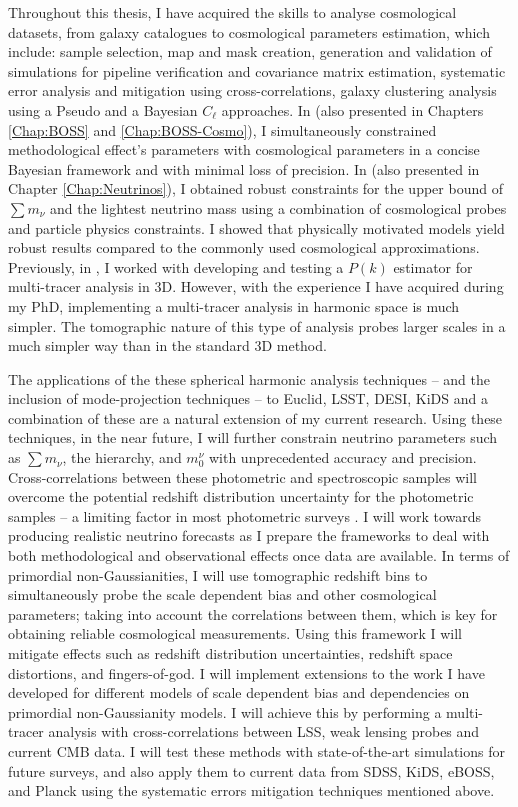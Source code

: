 \qquad Throughout this thesis, I have acquired the skills to analyse cosmological datasets, from galaxy catalogues to cosmological parameters estimation, which include: sample selection, map and mask creation, generation and validation of simulations for pipeline verification and covariance matrix estimation, systematic error analysis and mitigation using cross-correlations, galaxy clustering analysis using a Pseudo and a Bayesian $C_{\ell}$ approaches. In \cite{2018LoureiroBOSS} (also presented in Chapters \ref{Chap:BOSS} and \ref{Chap:BOSS-Cosmo}), I simultaneously constrained methodological effect's parameters with cosmological parameters in a concise Bayesian framework and with minimal loss of precision. In \cite{2018LoureiroNeutrinos} (also presented in Chapter \ref{Chap:Neutrinos}), I obtained robust constraints for the upper bound of $\sum m_{\nu}$ and the lightest neutrino mass using a combination of cosmological probes and particle physics constraints. I showed that physically motivated models yield robust results compared to the commonly used cosmological approximations. Previously, in \cite{2016AbramoSeccoLoureiro}, I worked with developing and testing a $P(k)$ estimator for multi-tracer analysis in 3D. However, with the experience I have acquired during my PhD, implementing a multi-tracer analysis in harmonic space is much simpler. The tomographic nature of this type of analysis probes larger scales in a much simpler way than in the standard 3D method.

\qquad The applications of the these spherical harmonic analysis techniques -- and the inclusion of mode-projection techniques -- to Euclid, LSST, DESI, KiDS and a combination of these are a natural extension of my current research. Using these techniques, in the near future, I will further constrain neutrino parameters such as $\sum m_{\nu}$, the hierarchy, and $m_{0}^{\nu}$ with unprecedented accuracy and precision. Cross-correlations between these photometric and spectroscopic samples will overcome the potential redshift distribution uncertainty for the photometric samples -- a limiting factor in most photometric surveys \citep{2016McLeod}. I will work towards producing realistic neutrino forecasts as I prepare the frameworks to deal with both methodological and observational effects once data are available. In terms of primordial non-Gaussianities, I will use tomographic redshift bins to simultaneously probe the scale dependent bias and other cosmological parameters; taking into account the correlations between them, which is key for obtaining reliable cosmological measurements. Using this framework I will mitigate effects such as redshift distribution uncertainties, redshift space distortions, and fingers-of-god. I will implement extensions to the work I have developed for different models of scale dependent bias and dependencies on primordial non-Gaussianity models. I will achieve this by performing a multi-tracer analysis with cross-correlations between LSS, weak lensing probes and current CMB data. I will test these methods with state-of-the-art simulations for future surveys, and also apply them to current data from SDSS, KiDS, eBOSS, and Planck using the systematic errors mitigation techniques mentioned above. 

